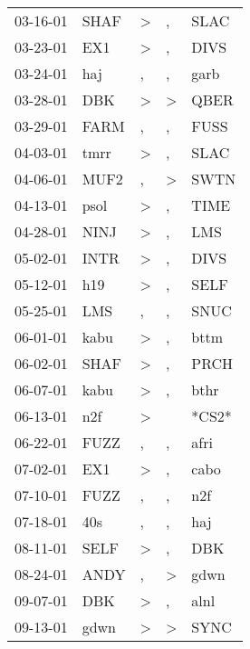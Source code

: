 \begin{supertabular}{lllll}
 03-16-01 &   SHAF &  \textgreater &                , &   SLAC \\
 03-23-01 &    EX1 &  \textgreater &                , &   DIVS \\
 03-24-01 &    haj &             , &                , &   garb \\
 03-28-01 &    DBK &  \textgreater &     \textgreater &   QBER \\
 03-29-01 &   FARM &             , &                , &   FUSS \\
 04-03-01 &   tmrr &  \textgreater &                , &   SLAC \\
 04-06-01 &   MUF2 &             , &     \textgreater &   SWTN \\
 04-13-01 &   psol &  \textgreater &                , &   TIME \\
 04-28-01 &   NINJ &  \textgreater &                , &    LMS \\
 05-02-01 &   INTR &  \textgreater &                , &   DIVS \\
 05-12-01 &    h19 &  \textgreater &                , &   SELF \\
 05-25-01 &    LMS &             , &                , &   SNUC \\
 06-01-01 &   kabu &  \textgreater &                , &   bttm \\
 06-02-01 &   SHAF &  \textgreater &                , &   PRCH \\
 06-07-01 &   kabu &  \textgreater &                , &   bthr \\
 06-13-01 &    n2f &  \textgreater &                  &  *CS2* \\
 06-22-01 &   FUZZ &             , &                , &   afri \\
 07-02-01 &    EX1 &  \textgreater &                , &   cabo \\
 07-10-01 &   FUZZ &             , &                , &    n2f \\
 07-18-01 &    40s &             , &                , &    haj \\
 08-11-01 &   SELF &  \textgreater &                , &    DBK \\
 08-24-01 &   ANDY &             , &     \textgreater &   gdwn \\
 09-07-01 &    DBK &  \textgreater &                , &   alnl \\
 09-13-01 &   gdwn &  \textgreater &     \textgreater &   SYNC \\

\end{supertabular}
